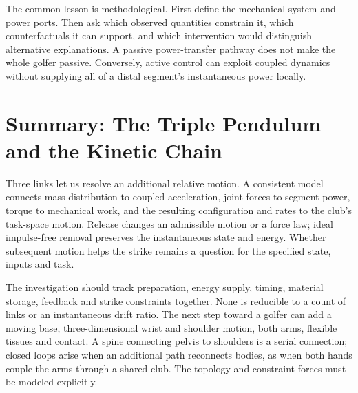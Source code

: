 The common lesson is methodological. First define the mechanical system and power ports. Then ask which observed quantities constrain it, which counterfactuals it can support, and which intervention would distinguish alternative explanations. A passive power-transfer pathway does not make the whole golfer passive. Conversely, active control can exploit coupled dynamics without supplying all of a distal segment's instantaneous power locally.

\section{Summary: The Triple Pendulum and the Kinetic Chain}
\label{sec:triple_pendulum_summary}
\label{princ:principle:triple_pendulum_key_takeaways}
Three links let us resolve an additional relative motion. A consistent model connects mass distribution to coupled acceleration, joint forces to segment power, torque to mechanical work, and the resulting configuration and rates to the club's task-space motion. Release changes an admissible motion or a force law; ideal impulse-free removal preserves the instantaneous state and energy. Whether subsequent motion helps the strike remains a question for the specified state, inputs and task.

The investigation should track preparation, energy supply, timing, material storage, feedback and strike constraints together. None is reducible to a count of links or an instantaneous drift ratio. The next step toward a golfer can add a moving base, three-dimensional wrist and shoulder motion, both arms, flexible tissues and contact. A spine connecting pelvis to shoulders is a serial connection; closed loops arise when an additional path reconnects bodies, as when both hands couple the arms through a shared club. The topology and constraint forces must be modeled explicitly.




